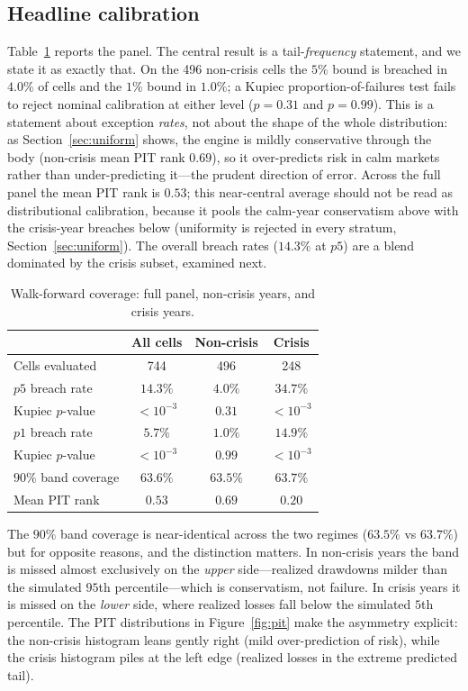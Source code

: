 \documentclass[11pt]{article}
\begin{document}
\subsection{Headline calibration}
Table~\ref{tab:headline} reports the panel. The central result is a
tail-\emph{frequency} statement, and we state it as exactly that. On the 496
non-crisis cells the $5\%$ bound is breached in $4.0\%$ of cells and the $1\%$
bound in $1.0\%$; a Kupiec proportion-of-failures test fails to reject nominal
calibration at either level ($p=0.31$ and $p=0.99$). This is a statement about
exception \emph{rates}, not about the shape of the whole distribution: as
Section~\ref{sec:uniform} shows, the engine is mildly conservative through the
body (non-crisis mean PIT rank $0.69$), so it over-predicts risk in calm markets
rather than under-predicting it---the prudent direction of error. Across the full
panel the mean PIT rank is $0.53$; this near-central average should not be read as
distributional calibration, because it pools the calm-year conservatism above with
the crisis-year breaches below (uniformity is rejected in every stratum,
Section~\ref{sec:uniform}). The overall breach rates ($14.3\%$ at $p5$) are a blend
dominated by the crisis subset, examined next.

\begin{table}[h]
\centering
\caption{Walk-forward coverage: full panel, non-crisis years, and crisis years.}
\label{tab:headline}
\begin{tabular}{lccc}
\toprule
 & All cells & Non-crisis & Crisis \\
\midrule
Cells evaluated          & 744      & 496      & 248 \\
$p5$ breach rate         & $14.3\%$ & $4.0\%$  & $34.7\%$ \\
\quad Kupiec $p$-value   & $<10^{-3}$ & $0.31$ & $<10^{-3}$ \\
$p1$ breach rate         & $5.7\%$  & $1.0\%$  & $14.9\%$ \\
\quad Kupiec $p$-value   & $<10^{-3}$ & $0.99$ & $<10^{-3}$ \\
$90\%$ band coverage     & $63.6\%$ & $63.5\%$ & $63.7\%$ \\
Mean PIT rank            & $0.53$   & $0.69$   & $0.20$ \\
\bottomrule
\end{tabular}
\end{table}

The $90\%$ band coverage is near-identical across the two regimes ($63.5\%$ vs
$63.7\%$) but for opposite reasons, and the distinction matters. In non-crisis
years the band is missed almost exclusively on the \emph{upper} side---realized
drawdowns milder than the simulated $95$th percentile---which is conservatism, not
failure. In crisis years it is missed on the \emph{lower} side, where realized
losses fall below the simulated $5$th percentile. The PIT distributions in
Figure~\ref{fig:pit} make the asymmetry explicit: the non-crisis histogram leans
gently right (mild over-prediction of risk), while the crisis histogram piles at
the left edge (realized losses in the extreme predicted tail).
\end{document}
